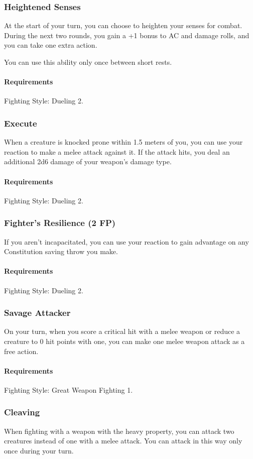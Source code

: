 \subsubsection{Heightened Senses} \label{feat::heightenedsenses}
    At the start of your turn, you can choose to heighten your senses for combat.
    During the next two rounds, you gain a +1 bonus to AC and damage rolls, and you can take one extra action.

    You can use this ability only once between short rests.
    \paragraph{Requirements} Fighting Style: Dueling 2.
\subsubsection{Execute} \label{feat::execute}
    When a creature is knocked prone within 1.5 meters of you, you can use your reaction to make a melee attack against it.
    If the attack hits, you deal an additional 2d6 damage of your weapon's damage type.
    \paragraph{Requirements} Fighting Style: Dueling 2.
\subsubsection{Fighter's Resilience (2 FP)} \label{feat::fightersresilience}
    If you aren't incapacitated, you can use your reaction to gain advantage on any Constitution saving throw you make.
    \paragraph{Requirements} Fighting Style: Dueling 2.
\subsubsection{Savage Attacker} \label{feat::savageattacker}
    On your turn, when you score a critical hit with a melee weapon or reduce a creature to 0 hit points with one, you can make one melee weapon attack as a free action.
    \paragraph{Requirements} Fighting Style: Great Weapon Fighting 1.
\subsubsection{Cleaving} \label{feat::cleaving}
    When fighting with a weapon with the heavy property, you can attack two creatures instead of one with a melee attack.
    You can attack in this way only once during your turn.

